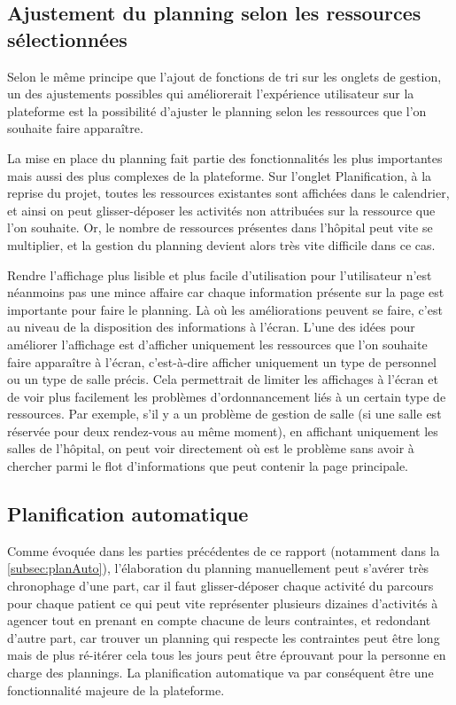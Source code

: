 \documentclass{polytech/polytech}
\begin{document}
\subsection{Ajustement du planning selon les ressources sélectionnées}

Selon le même principe que l'ajout de fonctions de tri sur les onglets de gestion, un des ajustements possibles qui améliorerait l'expérience utilisateur sur la plateforme est la possibilité d'ajuster le planning selon les ressources que l'on souhaite faire apparaître.

La mise en place du planning fait partie des fonctionnalités les plus importantes mais aussi des plus complexes de la plateforme. Sur l'onglet Planification, à la reprise du projet, toutes les ressources existantes sont affichées dans le calendrier, et ainsi on peut glisser-déposer les activités non attribuées sur la ressource que l'on souhaite. Or, le nombre de ressources présentes dans l'hôpital peut vite se multiplier, et la gestion du planning devient alors très vite difficile dans ce cas.

Rendre l'affichage plus lisible et plus facile d'utilisation pour l'utilisateur n'est néanmoins pas une mince affaire car chaque information présente sur la page est importante pour faire le planning. Là où les améliorations peuvent se faire, c'est au niveau de la disposition des informations à l'écran. L'une des idées pour améliorer l'affichage est d'afficher uniquement les ressources que l'on souhaite faire apparaître à l'écran, c'est-à-dire afficher uniquement un type de personnel ou un type de salle précis. Cela permettrait de limiter les affichages à l'écran et de voir plus facilement les problèmes d'ordonnancement liés à un certain type de ressources. Par exemple, s'il y a un problème de gestion de salle (si une salle est réservée pour deux rendez-vous au même moment), en affichant uniquement les salles de l'hôpital, on peut voir directement où est le problème sans avoir à chercher parmi le flot d'informations que peut contenir la page principale. 


\subsection{Planification automatique}

Comme évoquée dans les parties précédentes de ce rapport (notamment dans la \autoref{subsec:planAuto}), l'élaboration du planning manuellement peut s'avérer très chronophage d'une part, car il faut glisser-déposer chaque activité du parcours pour chaque patient ce qui peut vite représenter plusieurs dizaines d'activités à agencer tout en prenant en compte chacune de leurs contraintes, et redondant d'autre part, car trouver un planning qui respecte les contraintes peut être long mais de plus ré-itérer cela tous les jours peut être éprouvant pour la personne en charge des plannings. La planification automatique va par conséquent être une fonctionnalité majeure de la plateforme. 
\end{document}
